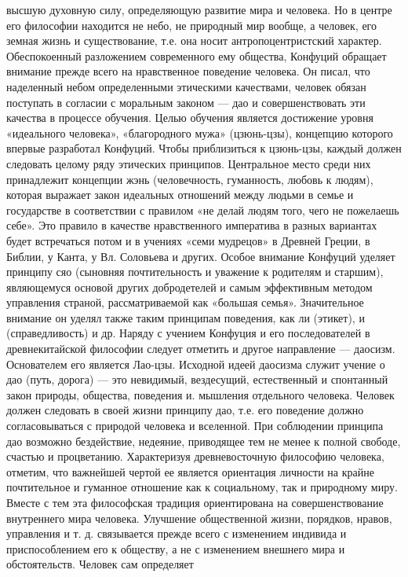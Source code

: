 \documentclass[12pt]{article}
\begin{document}
высшую духовную силу, определяющую развитие мира и человека. Но в центре его философии находится не
небо,  не  природный  мир  вообще,  а  человек,  его  земная  жизнь  и  существование,  т.е.  она  носит
антропоцентристский характер.
Обеспокоенный  разложением  современного  ему  общества,  Конфуций  обращает  внимание  прежде  всего  на
нравственное поведение человека. Он писал, что наделенный небом определенными этическими качествами,
человек обязан поступать в согласии с моральным законом — дао и совершенствовать эти качества в процессе
обучения. Целью обучения является достижение уровня «идеального человека», «благородного мужа» (цзюнь-цзы), концепцию которого впервые разработал Конфуций. Чтобы приблизиться к цзюнь-цзы, каждый должен
следовать целому ряду этических принципов. Центральное место среди них принадлежит концепции жэнь
(человечность, гуманность, любовь к людям), которая выражает закон идеальных отношений между людьми в
семье и государстве в соответствии с правилом «не делай людям того, чего не пожелаешь себе». Это правило в
качестве нравственного императива в разных вариантах будет встречаться потом и в учениях «семи мудрецов» в
Древней Греции, в Библии, у Канта, у Вл. Соловьева и других. Особое внимание Конфуций уделяет принципу
сяо (сыновняя почтительность и уважение к родителям и старшим), являющемуся основой других добродетелей
и самым эффективным методом управления страной, рассматриваемой как «большая семья». Значительное
внимание он уделял также таким принципам поведения, как ли (этикет), и (справедливость) и др.
Наряду с учением Конфуция и его последователей в древнекитайской философии следует отметить и другое
направление — даосизм. Основателем его является Лао-цзы. Исходной идеей даосизма служит учение о дао
(путь, дорога) — это невидимый, вездесущий, естественный и спонтанный закон природы, общества, поведения
и. мышления отдельного человека. Человек должен следовать в своей жизни принципу дао, т.е. его поведение
должно  согласовываться  с  природой  человека  и  вселенной.  При  соблюдении  принципа  дао  возможно
бездействие, недеяние, приводящее тем не менее к полной свободе, счастью и процветанию.
Характеризуя древневосточную философию человека, отметим, что важнейшей чертой ее является ориентация
личности на крайне почтительное и гуманное отношение как к социальному, так и природному миру. Вместе с
тем эта философская традиция ориентирована на совершенствование внутреннего мира человека. Улучшение
общественной жизни, порядков, нравов, управления и т. д. связывается прежде всего с изменением индивида и
приспособлением его к обществу, а не с изменением внешнего мира и обстоятельств. Человек сам определяет
\end{document}
